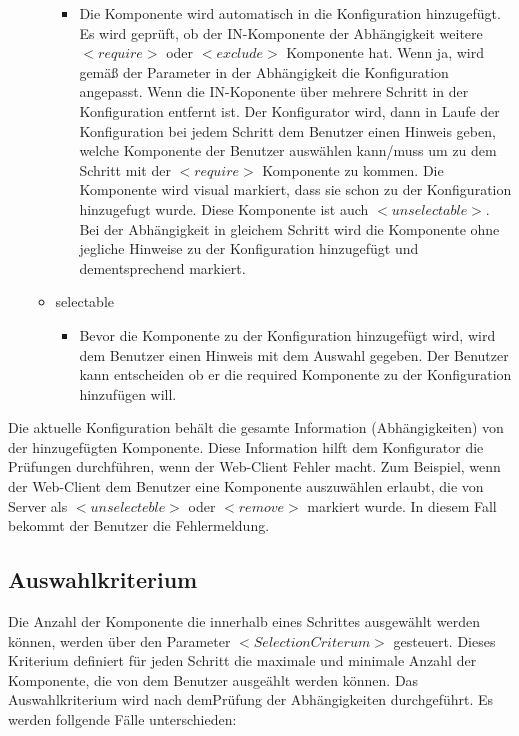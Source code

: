 \documentclass{article}
\begin{document}
\begin{itemize}
\begin{itemize}
        \begin{itemize}
          \item Die Komponente wird automatisch in die Konfiguration hinzugef\"ugt.
          Es wird gepr\"uft, ob der IN-Komponente der Abh\"angigkeit weitere
          $<require>$ oder $<exclude>$ Komponente hat. Wenn ja, wird gem\"a\ss{} der
          Parameter in der Abh\"angigkeit die Konfiguration angepasst. Wenn die
          IN-Koponente über mehrere Schritt in der Konfiguration entfernt ist. Der
          Konfigurator wird, dann in Laufe der Konfiguration bei jedem Schritt dem
          Benutzer einen Hinweis geben, welche Komponente der Benutzer ausw\"ahlen
          kann/muss um zu dem Schritt mit der $<require>$ Komponente zu kommen. Die
          Komponente wird visual markiert, dass sie schon zu der Konfiguration
          hinzugefugt wurde. Diese Komponente ist auch $<unselectable>$. Bei der
          Abh\"angigkeit in gleichem Schritt wird die Komponente ohne jegliche
          Hinweise zu der Konfiguration hinzugef\"ugt und dementsprechend markiert.
        \end{itemize}
    
        \item selectable
    
        \begin{itemize}
            \item Bevor die Komponente zu der Konfiguration hinzugef\"ugt wird, wird
            dem Benutzer einen Hinweis mit dem Auswahl gegeben. Der Benutzer kann
            entscheiden ob er die required Komponente zu der Konfiguration
            hinzuf\"ugen will.
        \end{itemize}
    \end{itemize}
\end{itemize}

Die aktuelle Konfiguration beh\"alt die gesamte Information (Abh\"angigkeiten)
von der hinzugef\"ugten Komponente. Diese Information hilft dem Konfigurator die
Pr\"ufungen durchf\"uhren, wenn der Web-Client Fehler macht. Zum Beispiel, wenn
der Web-Client dem Benutzer eine Komponente auszuw\"ahlen erlaubt, die von
Server als $<unselecteble>$ oder $<remove>$ markiert wurde. In diesem Fall
bekommt der Benutzer die Fehlermeldung.

\subsection{Auswahlkriterium}

Die Anzahl der Komponente die innerhalb eines Schrittes ausgew\"ahlt werden
können, werden über den Parameter $<SelectionCriterum>$ gesteuert. Dieses
Kriterium definiert für jeden Schritt die maximale und minimale Anzahl der
Komponente, die von dem Benutzer ausge\"ahlt werden k\"onnen. Das Auswahlkriterium 
wird nach demPr\"ufung der Abh\"angigkeiten durchgeführt. Es werden follgende F\"alle
unterschieden:\\\\
\end{document}
